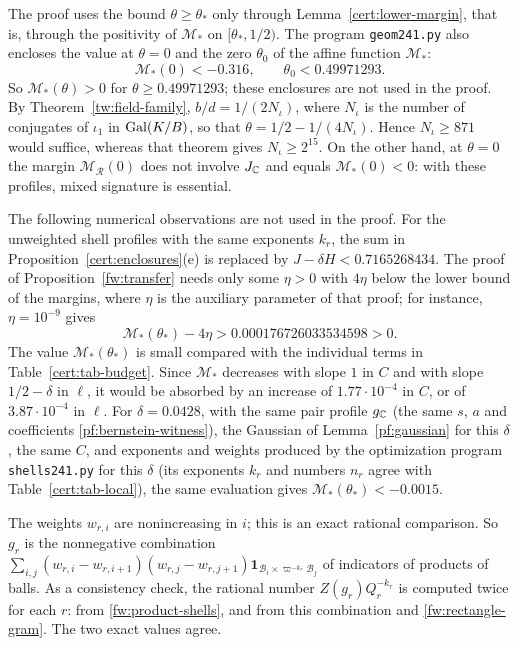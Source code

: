 \begin{remark}\label{cert:signature-remark}
The proof uses the bound $\theta\ge\theta_*$ only through
Lemma~\ref{cert:lower-margin}, that is, through the positivity of
$\mathcal M_*$ on $[\theta_*,1/2)$. The program \texttt{geom241.py} also
encloses the value at $\theta=0$ and the zero $\theta_0$ of the affine
function $\mathcal M_*$:
\[
 \mathcal M_*(0)<-0.316,\qquad \theta_0<0.49971293 .
\]
So $\mathcal M_*(\theta)>0$ for $\theta\ge0.49971293$; these enclosures
are not used in the proof. By Theorem~\ref{tw:field-family},
$b/d=1/(2N_\iota)$, where $N_\iota$ is the number of conjugates of
$\iota_1$ in $\operatorname{Gal}(K/B)$, so that $\theta=1/2-1/(4N_\iota)$. Hence
$N_\iota\ge871$ would suffice, whereas that theorem gives
$N_\iota\ge2^{15}$. On the other hand, at $\theta=0$ the margin
$\mathcal M_{\mathcal R}(0)$ does not involve $J_\mathbb C$ and equals
$\mathcal M_*(0)<0$: with these profiles, mixed signature is essential.
\end{remark}

\begin{remark}\label{cert:observations}
The following numerical observations are not used in the proof. For the
unweighted shell profiles with the same exponents $k_r$, the sum in
Proposition~\ref{cert:enclosures}(e) is replaced by
$J-\delta H<0.7165268434$. The proof of Proposition~\ref{fw:transfer}
needs only some $\eta>0$ with $4\eta$ below the lower bound of the
margins, where $\eta$ is the auxiliary parameter of that proof; for
instance, $\eta=10^{-9}$ gives
\begin{equation}\label{cert:final-margin}
 \mathcal M_*(\theta_*)-4\eta>0.000176726033534598>0 .
\end{equation}
The value $\mathcal M_*(\theta_*)$ is small compared with the individual
terms in Table~\ref{cert:tab-budget}. Since $\mathcal M_*$ decreases with
slope $1$ in $C$ and with slope $1/2-\delta$ in $\ell$, it would be
absorbed by an increase of $1.77\cdot10^{-4}$ in $C$, or of
$3.87\cdot10^{-4}$ in $\ell$. For $\delta=0.0428$, with the same pair
profile $g_\mathbb C$ (the same $s$, $a$ and coefficients
\eqref{pf:bernstein-witness}), the Gaussian of Lemma~\ref{pf:gaussian}
for this $\delta$, the same $C$, and exponents and weights produced by
the optimization program \texttt{shells241.py} for this $\delta$ (its
exponents $k_r$ and numbers $n_r$ agree with
Table~\ref{cert:tab-local}), the same evaluation gives
$\mathcal M_*(\theta_*)<-0.0015$.
\end{remark}

\begin{remark}\label{cert:consistency}
The weights $w_{r,i}$ are nonincreasing in $i$; this is an exact
rational comparison. So $g_r$ is the nonnegative combination
$\sum_{i,j}(w_{r,i}-w_{r,i+1})(w_{r,j}-w_{r,j+1})\mathbf 1_{\mathcal
B_i\times\varpi^{-k_r}\mathcal B_j}$ of indicators of products of balls.
As a consistency check, the rational number $Z(g_r)Q_r^{-k_r}$ is
computed twice for each $r$: from \eqref{fw:product-shells}, and from
this combination and \eqref{fw:rectangle-gram}. The two exact values
agree.
\end{remark}

